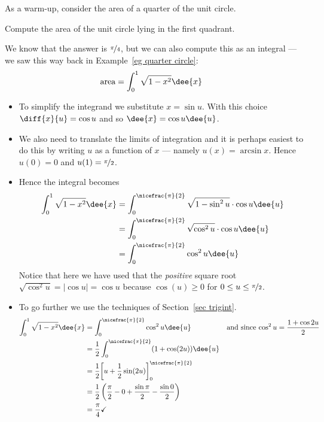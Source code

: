 As a warm-up, consider the area of a quarter of the unit circle.
\begin{eg}\label{eg first trigsub}
 Compute the area of the unit circle lying in the first quadrant.

\soln We know that the answer is $\nicefrac\pi4$, but we can also compute this as an
integral --- we saw this way back in Example~\ref{eg quarter circle}:
\begin{align*}
  \text{area} &= \int_0^1 \sqrt{1-x^2} \dee{x}
\end{align*}
\begin{itemize}
 \item To simplify the integrand we substitute $x=\sin u$. With this choice
$\diff{x}{u}=\cos u$ and so $\dee{x}=\cos u \dee{u}$.
\item We also need to translate the limits of integration and it is perhaps
easiest to do this by writing $u$ as a function of $x$ --- namely $u(x)=\arcsin
x$. Hence $u(0)=0$ and $u(1)=\nicefrac{\pi}{2}$.
\item Hence the integral becomes
\begin{align*}
  \int_0^1 \sqrt{1-x^2}\dee{x}
&= \int_0^{\nicefrac{\pi}{2}} \sqrt{1-\sin^2u} \cdot \cos u \dee{u}\\
&= \int_0^{\nicefrac{\pi}{2}} \sqrt{\cos^2u} \cdot \cos u \dee{u}\\
&= \int_0^{\nicefrac{\pi}{2}} \cos^2 u \dee{u}
\end{align*}
Notice that here we have used that the \emph{positive} square root $\sqrt{\cos^2
u} = |\cos u|=\cos u$ because  $\cos(u)\geq 0$ for $0 \leq u \leq
\nicefrac\pi2$.
\item To go further we use the techniques of Section~\ref{sec trigint}.
\begin{align*}
\int_0^1 \sqrt{1-x^2}\dee{x}
&= \int_0^{\nicefrac{\pi}{2}}\cos^2 u \dee{u} & \text{and since
$\cos^2u=\frac{1+\cos2u}{2}$}\\
&= \frac{1}{2}\int_0^{\nicefrac{\pi}{2}} (1+\cos(2 u)) \dee{u}\\
&= \frac{1}{2} \bigg[u + \frac{1}{2}\sin(2u) \bigg]_0^{\nicefrac{\pi}{2}}\\
&= \frac{1}{2} \left(\frac{\pi}{2}-0 + \frac{\sin\pi}{2}-\frac{\sin 0}{2} \right)\\
&= \frac{\pi}{4}\checkmark
\end{align*}
\end{itemize}
\end{eg}

